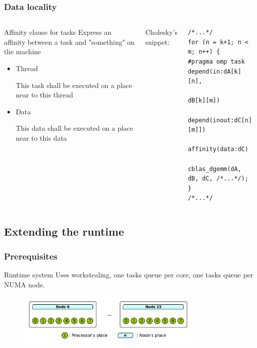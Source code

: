 \documentclass[xcolor={usenames,dvipsnames,svgnames,table}, aspectratio=43]{beamer}
\begin{document}
\begin{frame}[fragile]
\frametitle{Data locality}
\begin{columns}[T,onlytextwidth]
\begin{block}{Affinity clause for tasks}
Express an affinity between a task and "something" on the machine
  \begin{itemize}
    \item Thread

      \textcolor{YellowOrange}{
      This task shall be executed on a place near to this thread
    }
    \item Data

      \textcolor{YellowOrange}{
      This data shall be executed on a place near to this data
    }
  \end{itemize}

\end{block}



  \small{Cholesky's snippet:}

\begin{lstlisting}[numbers=none]
/*...*/
for (n = k+1; n < m; n++) {
#pragma omp task depend(in:dA[k][n],
                           dB[k][m])
                 depend(inout:dC[n][m]])
                 affinity(data:dC)
    cblas_dgemm(dA, dB, dC, /*...*/);
}
/*...*/
\end{lstlisting}
\end{columns}

\end{frame}




\subsection{Extending the runtime}


\begin{frame}[fragile]
\frametitle{Prerequisites}
\begin{block}{Runtime system}
  Uses workstealing, one tasks queue per core, one tasks queue per NUMA node.
    \begin{figure}
        \includegraphics[width=0.8\textwidth]{graph/topology.pdf}
    \end{figure}
\end{block}


\end{frame}
\end{document}
